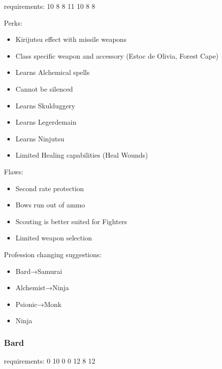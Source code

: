 \documentclass[12pt]{article}
\newcommand{\indexSpell}[1]{\index{#1}}
\newcommand{\spell}[1]{#1\indexSpell{#1}}
\newcommand{\WviiTwoColumnSetup}{\raggedcolumns\RaggedRight}
\begin{document}
requirements: 10 8 8 11 10 8 8

\begin{multicols}{2}\WviiTwoColumnSetup
Perks:

\begin{itemize}
\item
  Kirijutsu effect with missile weapons
\item
  Class specific weapon and accessory (Estoc de Olivia, Forest Cape)
\item
  Learns Alchemical spells
\item
  Cannot be silenced
\item
  Learns Skulduggery
\item
  Learns Legerdemain
\item
  Learns Ninjutsu
\item
  Limited Healing capabilities (\spell{Heal Wounds})
\end{itemize}
\columnbreak

Flaws:

\begin{itemize}
\item
  Second rate protection
\item
  Bows run out of ammo
\item
  Scouting is better suited for Fighters
\item
  Limited weapon selection
\end{itemize}
\end{multicols}

Profession changing suggestions:

\begin{itemize}
\item
  Bard→Samurai
\item
  Alchemist→Ninja
\item
  Psionic→Monk
\item
  Ninja
\end{itemize}

\subsubsection{Bard}\label{bard}

requirements: 0 10 0 0 12 8 12
\end{document}

